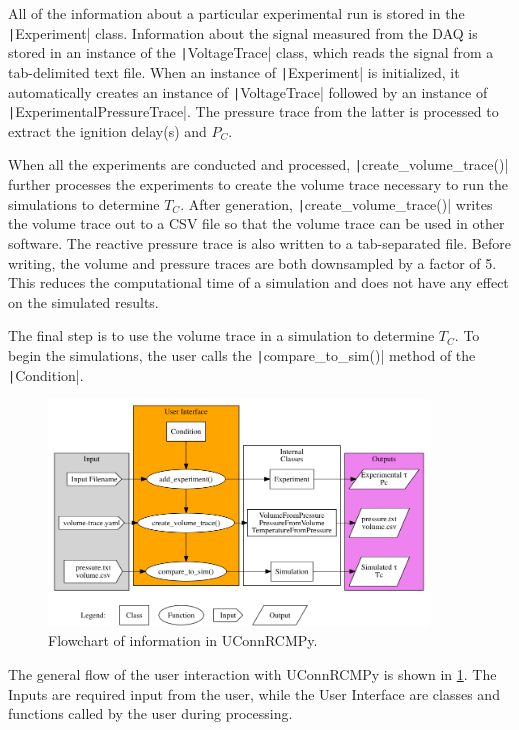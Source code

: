 \documentclass[12pt]{../ussci}
\begin{document}
All of the information about a particular experimental run is stored in
the \texttt|Experiment| class. Information about the signal
measured from the DAQ is stored in an instance of the
\texttt|VoltageTrace| class, which reads the signal from a
tab-delimited text file. When an instance of \texttt|Experiment|
is initialized, it automatically creates an instance of
\texttt|VoltageTrace| followed by an instance of
\texttt|ExperimentalPressureTrace|. The pressure trace from the
latter is processed to extract the ignition delay(s) and \(P_C\).

When all the experiments are conducted and processed,
\texttt|create_volume_trace()| further processes the experiments to
create the volume trace necessary to run the simulations to determine
\(T_C\). After generation, \texttt|create_volume_trace()| writes
the volume trace out to a CSV file so that the volume trace can be used in
other software. The reactive pressure trace is also written to a tab-separated
file. Before writing, the volume and pressure traces are both
downsampled by a factor of 5. This reduces the computational time of a
simulation and does not have any effect on the simulated results.

The final step is to use the volume trace in a simulation to determine
\(T_C\). To begin the simulations, the user calls the
\texttt|compare_to_sim()| method of the
\texttt|Condition|.

\begin{figure}[htbp]
\centering
\includegraphics[width=0.9\textwidth]{figures/flowchart.png}
\caption{Flowchart of information in UConnRCMPy.}
\label{fig:flowchart}
\end{figure}

The general flow of the user interaction with UConnRCMPy is shown in
\cref{fig:flowchart}. The Inputs are required input from the
user, while the User Interface are classes and functions called by the
user during processing.
\end{document}
